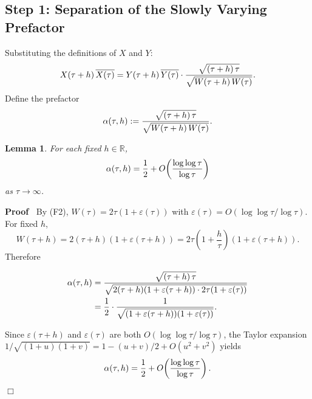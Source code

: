 \documentclass{article}
\newcommand{\assign}{:=}
\newenvironment{proof}{\noindent\textbf{Proof\ }}{\hspace*{\fill}$\Box$\medskip}
\newtheorem{lemma}{Lemma}
\begin{document}
\subsection*{Step 1: Separation of the Slowly Varying Prefactor}

Substituting the definitions of $X$ and $Y$:
\[ X (\tau + h) \hspace{0.17em} \overline{X (\tau)} = Y (\tau + h)
   \hspace{0.17em} \overline{Y (\tau)} \cdot \frac{\sqrt{(\tau + h) 
   \hspace{0.17em} \tau}}{\sqrt{W (\tau + h)  \hspace{0.17em} W (\tau)}} . \]
Define the prefactor
\begin{equation}
  \label{eq:alpha-def} \alpha (\tau, h) \assign \frac{\sqrt{(\tau + h) 
  \hspace{0.17em} \tau}}{\sqrt{W (\tau + h)  \hspace{0.17em} W (\tau)}} .
\end{equation}
\begin{lemma}
  \label{lem:alpha}For each fixed $h \in \mathbb{R}$,
  \[ \alpha (\tau, h) = \frac{1}{2} + O \hspace{-0.17em} \left( \frac{\log
     \log \tau}{\log \tau} \right) \]
  as $\tau \to \infty$.
\end{lemma}

\begin{proof}
  By (F2), $W (\tau) = 2 \tau (1 + \varepsilon (\tau))$ with $\varepsilon
  (\tau) = O (\log \log \tau / \log \tau)$. For fixed $h$,
  \[ W (\tau + h) = 2 (\tau + h)  (1 + \varepsilon (\tau + h)) = 2 \tau \left(
     1 + \frac{h}{\tau} \right)  (1 + \varepsilon (\tau + h)) . \]
  Therefore
  
  \begin{align*}
    \alpha (\tau, h) & = \frac{\sqrt{(\tau + h)  \hspace{0.17em}
    \tau}}{\sqrt{2 (\tau + h)  (1 + \varepsilon (\tau + h)) \cdot 2 \tau (1 +
    \varepsilon (\tau))}}\\
    & = \frac{1}{2} \cdot \frac{1}{\sqrt{(1 + \varepsilon (\tau + h))  (1 +
    \varepsilon (\tau))}} .
  \end{align*}
  
  Since $\varepsilon (\tau + h)$ and $\varepsilon (\tau)$ are both $O (\log
  \log \tau / \log \tau)$, the Taylor expansion $1 / \sqrt{(1 + u)  (1 + v)} =
  1 - (u + v) / 2 + O (u^2 + v^2)$ yields
  \[ \alpha (\tau, h) = \frac{1}{2} + O \hspace{-0.17em} \left( \frac{\log
     \log \tau}{\log \tau} \right) . \]
\end{proof}
\end{document}

